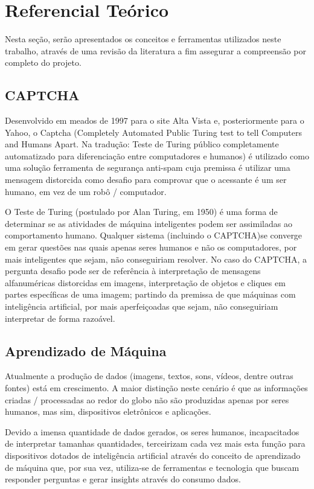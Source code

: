 \section{Referencial Teórico}
Nesta seção, serão apresentados os conceitos e ferramentas utilizados neste trabalho, através de uma revisão da literatura a fim assegurar a compreensão por completo do projeto. 

\subsection{CAPTCHA}

Desenvolvido em meados de 1997 para o site Alta Vista e, posteriormente para o Yahoo, o Captcha (Completely Automated Public Turing test to tell Computers and Humans Apart. Na tradução: Teste de Turing público completamente automatizado para diferenciação entre computadores e humanos) é utilizado como uma solução ferramenta de segurança anti-spam cuja premissa é utilizar uma mensagem distorcida como desafio para comprovar que o acessante é um ser humano, em vez de um robô / computador.

O Teste de Turing (postulado por  Alan Turing, em 1950) é uma forma de determinar se as atividades de máquina inteligentes podem ser assimiladas ao comportamento humano.  Qualquer sistema (incluindo o CAPTCHA)se converge em gerar questões nas quais apenas seres humanos e não os computadores, por mais inteligentes que sejam, não conseguiriam resolver. No caso do CAPTCHA, a pergunta desafio pode ser de referência à interpretação de mensagens alfanuméricas distorcidas em imagens, interpretação de objetos e cliques em partes específicas de uma imagem; partindo da premissa de que máquinas com inteligência artificial, por mais aperfeiçoadas que sejam, não conseguiriam interpretar de forma razoável.

\subsection{Aprendizado de Máquina}

Atualmente a produção de dados (imagens, textos, sons, vídeos, dentre outras fontes) está em crescimento. A maior distinção neste cenário é que as informações criadas / processadas ao redor do globo não são produzidas apenas por seres humanos, mas sim, dispositivos eletrônicos e aplicações. 

Devido a imensa quantidade de dados gerados, os seres humanos, incapacitados de interpretar tamanhas quantidades, terceirizam cada vez mais esta função para dispositivos dotados de inteligência artificial através do conceito de aprendizado de máquina que, por sua vez, utiliza-se de ferramentas e tecnologia que buscam responder perguntas e gerar insights através do consumo dados\cite{santos2018identificaccao}.

